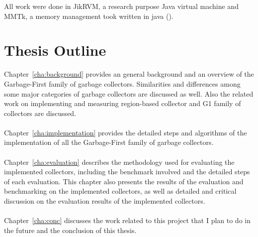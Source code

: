All work were done in JikRVM, a research purpose Java virtual machine and MMTk,
a memory management took written in java (\cite{blackburn2004oil}).

\section{Thesis Outline}

Chapter~\ref{cha:background}
provides an general background and an overview of the Garbage-First family of garbage collectors.
Similarities and differences among some major categories of garbage collectors are discussed as well.
Also the related work on implementing and measuring region-based collector and G1 family
of collectors are discussed.
\\\\
Chapter~\ref{cha:implementation} provides the detailed steps and algorithms of the implementation of
all the Garbage-First family of garbage collectors.
\\\\
Chapter~\ref{cha:evaluation}
describes the methodology used for evaluating the implemented collectors,
including the benchmark involved and the detailed steps of each evaluation.
This chapter also presents the results of the evaluation and benchmarking on the implemented collectors,
as well as detailed and critical discussion on the evaluation results of the
implemented collectors.
\\\\
Chapter~\ref{cha:conc} discusses the work related to this project that I plan to do in the future and the conclusion of this thesis.